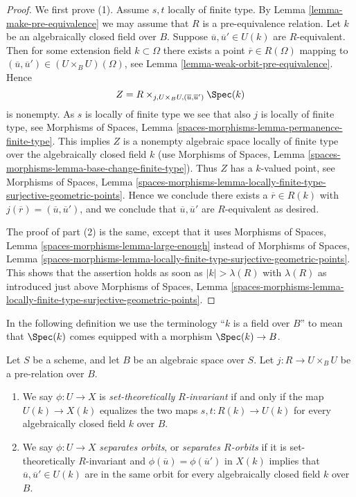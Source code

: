\begin{proof}
We first prove (1). Assume $s, t$ locally of finite type. By
Lemma \ref{lemma-make-pre-equivalence}
we may assume that $R$ is a pre-equivalence relation.
Let $k$ be an algebraically closed field over $B$.
Suppose $\overline{u}, \overline{u}' \in U(k)$ are $R$-equivalent.
Then for some extension field $k \subset \Omega$ there exists
a point $\overline{r} \in R(\Omega)$ mapping to
$(\overline{u}, \overline{u}') \in (U \times_B U)(\Omega)$, see
Lemma \ref{lemma-weak-orbit-pre-equivalence}.
Hence
$$
Z = R \times_{j, U \times_B U, (\overline{u}, \overline{u}')} \Spec(k)
$$
is nonempty. As $s$ is locally of finite type we see that
also $j$ is locally of finite type, see
Morphisms of Spaces, Lemma \ref{spaces-morphisms-lemma-permanence-finite-type}.
This implies $Z$ is a nonempty algebraic space locally of finite type
over the algebraically closed field $k$ (use
Morphisms of Spaces,
Lemma \ref{spaces-morphisms-lemma-base-change-finite-type}).
Thus $Z$ has a $k$-valued point, see
Morphisms of Spaces, Lemma
\ref{spaces-morphisms-lemma-locally-finite-type-surjective-geometric-points}.
Hence we conclude there exists a $\overline{r} \in R(k)$ with
$j(\overline{r}) = (\overline{u}, \overline{u}')$, and we conclude that
$\overline{u}, \overline{u}'$ are $R$-equivalent as desired.

\medskip\noindent
The proof of part (2) is the same, except that it uses
Morphisms of Spaces, Lemma
\ref{spaces-morphisms-lemma-large-enough}
instead of
Morphisms of Spaces, Lemma
\ref{spaces-morphisms-lemma-locally-finite-type-surjective-geometric-points}.
This shows that the assertion holds as soon as $|k| > \lambda(R)$ with
$\lambda(R)$ as introduced just above
Morphisms of Spaces, Lemma
\ref{spaces-morphisms-lemma-locally-finite-type-surjective-geometric-points}.
\end{proof}

\noindent
In the following definition we use the terminology ``$k$ is a field
over $B$'' to mean that $\Spec(k)$ comes equipped with a morphism
$\Spec(k) \to B$.

\begin{definition}
\label{definition-set-theoretically-invariant}
Let $S$ be a scheme, and let $B$ be an algebraic space over $S$.
Let $j : R \to U \times_B U$ be a pre-relation over $B$.
\begin{enumerate}
\item We say $\phi : U \to X$ is {\it set-theoretically $R$-invariant}
if and only if the map $U(k) \to X(k)$ equalizes the two maps
$s, t : R(k) \to U(k)$ for every algebraically closed field $k$
over $B$.
\item We say $\phi : U \to X$ {\it separates orbits}, or
{\it separates $R$-orbits} if it is set-theoretically $R$-invariant and
$\phi(\overline{u}) = \phi(\overline{u}')$ in $X(k)$ implies that
$\overline{u}, \overline{u}' \in U(k)$ are in the same orbit
for every algebraically closed field $k$ over $B$.
\end{enumerate}
\end{definition}

